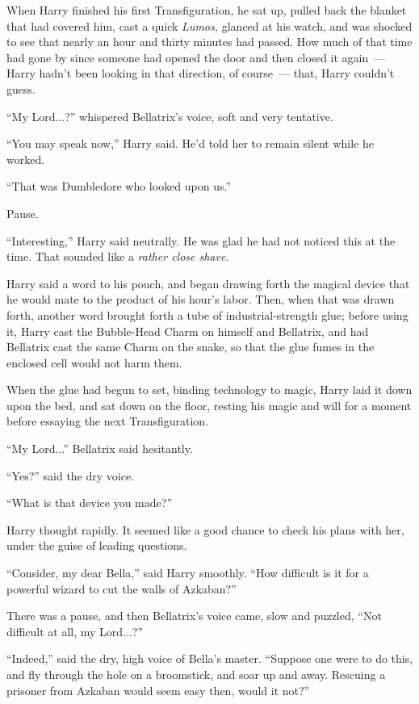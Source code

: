 When Harry finished his first Transfiguration, he sat up, pulled back the blanket that had covered him, cast a quick \emph{Lumos,} glanced at his watch, and was shocked to see that nearly an hour and thirty minutes had passed. How much of that time had gone by since someone had opened the door and then closed it again~--- Harry hadn't been looking in that direction, of course~--- that, Harry couldn't guess.

``My Lord...?'' whispered Bellatrix's voice, soft and very tentative.

``You may speak now,'' Harry said. He'd told her to remain silent while he worked.

``That was Dumbledore who looked upon us.''

Pause.

``Interesting,'' Harry said neutrally. He was glad he had not noticed this at the time. That sounded like a \emph{rather close shave}.

Harry said a word to his pouch, and began drawing forth the magical device that he would mate to the product of his hour's labor. Then, when that was drawn forth, another word brought forth a tube of industrial-strength glue; before using it, Harry cast the Bubble-Head Charm on himself and Bellatrix, and had Bellatrix cast the same Charm on the snake, so that the glue fumes in the enclosed cell would not harm them.

When the glue had begun to set, binding technology to magic, Harry laid it down upon the bed, and sat down on the floor, resting his magic and will for a moment before essaying the next Transfiguration.

``My Lord...'' Bellatrix said hesitantly.

``Yes?'' said the dry voice.

``What is that device you made?''

Harry thought rapidly. It seemed like a good chance to check his plans with her, under the guise of leading questions.

``Consider, my dear Bella,'' said Harry smoothly. ``How difficult is it for a powerful wizard to cut the walls of Azkaban?''

There was a pause, and then Bellatrix's voice came, slow and puzzled, ``Not difficult at all, my Lord...?''

``Indeed,'' said the dry, high voice of Bella's master. ``Suppose one were to do this, and fly through the hole on a broomstick, and soar up and away. Rescuing a prisoner from Azkaban would seem easy then, would it not?''

